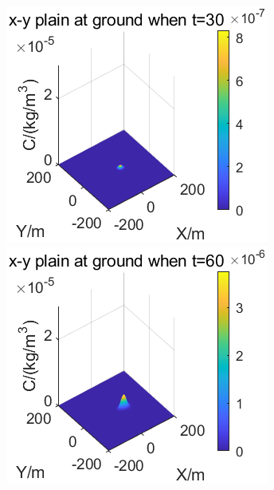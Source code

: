 \documentclass{article}
\begin{document}
	\begin{figure}[htbp]
		\begin{minipage}{0.33\textwidth}
			\includegraphics[width=\textwidth]{pics/g=0,t=30.png}
		\end{minipage}
		\begin{minipage}{0.33\textwidth}
			\includegraphics[width=\textwidth]{pics/g=0,t=60.png}
		\end{minipage}

\end{figure}
\end{document}
